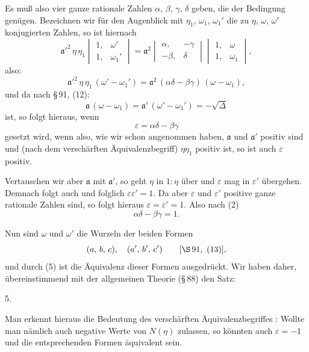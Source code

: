 
 Es muß also vier ganze rationale Zahlen
$\alpha$, $\beta$, $\gamma$, $\delta$ geben, die der Bedingung
genügen. Bezeichnen wir für den Augenblick mit $\eta_1$, $\omega_1$, $\omega_1'$ die
zu $\eta$, $\omega$, $\omega'$ konjugierten Zahlen, so ist hiernach
\[
\mathfrak{a}'^2\, \eta\, \eta_1
\begin{vmatrix} 1, & \omega' \\ 1, & \omega_1' \end{vmatrix}
= \mathfrak{a}^2
\begin{vmatrix} \alpha, & -\gamma \\ -\beta, & \delta \end{vmatrix}
\begin{vmatrix} 1, & \omega \\ 1, & \omega_1 \end{vmatrix},
\]
also:
\[
\mathfrak{a}'^2\, \eta\, \eta_1\,(\omega' - \omega_1') = \mathfrak{a}^2\,(\alpha\delta - \beta\gamma)\,(\omega - \omega_1),
\]
und da nach \S\,91, (12):
\[
\mathfrak{a}\,(\omega - \omega_1) = \mathfrak{a}'\,(\omega' - \omega_1') = -\sqrt{\Delta}
\]
ist, so folgt hieraus, wenn
\[
\varepsilon = \alpha\delta - \beta\gamma
\]
gesetzt wird,
wenn also, wie wir schon angenommen haben, $\mathfrak{a}$ und $\mathfrak{a}'$ positiv
sind und (nach dem verschärften Äquivalenzbegriff) $\eta\eta_1$ positiv
ist, so ist auch $\varepsilon$ positiv.

Vertauschen wir aber $\mathfrak{a}$ mit $\mathfrak{a}'$, so geht $\eta$ in $1 : \eta$ über und
$\varepsilon$ mag in $\varepsilon'$ übergehen. Demnach folgt auch
und folglich $\varepsilon \varepsilon' = 1$. Da aber $\varepsilon$ und $\varepsilon'$ positive ganze rationale
Zahlen sind, so folgt hieraus $\varepsilon = \varepsilon' = 1$. Also nach (2)
\[
\alpha\delta - \beta\gamma = 1.
\]

Nun sind $\omega$ und $\omega'$ die Wurzeln der beiden Formen
\[
(a,\, b,\, c), \quad (a',\, b',\, c') \qquad [\S\,91,\ (13)],
\]
und durch (5) ist die Äquivalenz dieser Formen ausgedrückt.
Wir haben daher, übereinstimmend mit der allgemeinen Theorie
(\S\,88) den Satz:

5. 

Man erkennt hieraus die Bedeutung des verschärften Äquivalenzbegriffes
: Wollte man nämlich auch negative Werte von
$N(\eta)$ zulassen, so könnten auch $\varepsilon = -1$ und die entsprechenden
Formen  äquivalent sein.
